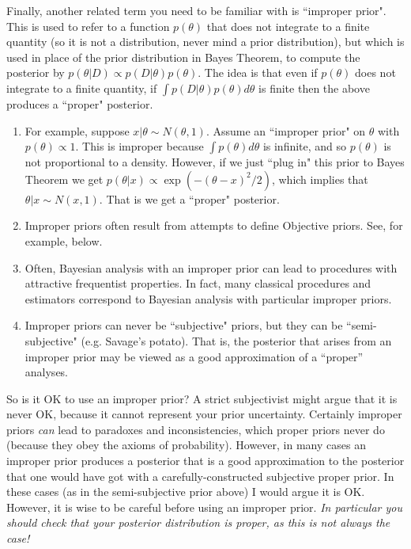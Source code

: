 \documentclass[12pt]{article}
\begin{document}
Finally, another related term you need to be familiar with is ``improper prior". This is used to refer to a function $p(\theta)$ that does not integrate to a finite quantity (so it is not a distribution, never mind a prior distribution), but which is used in place of the prior distribution in Bayes Theorem, to compute the posterior by
$p(\theta | D) \propto p(D|\theta) p(\theta)$. 
The idea is that even if $p(\theta)$ does not integrate to a finite quantity,
if $\int p(D|\theta) p(\theta) d\theta$ is finite then
the above produces a ``proper" posterior. 
\begin{enumerate}
\item For example, suppose $x | \theta \sim N(\theta,1)$. Assume an ``improper prior" on $\theta$ with $p(\theta) \propto 1$. This is improper because $\int p(\theta) d\theta$ is infinite, and so $p(\theta)$ is not proportional to a density. However, if we just ``plug in" this prior to Bayes Theorem we get
$p(\theta | x) \propto \exp(-(\theta-x)^2/2)$, which implies that $\theta | x \sim N(x,1)$. That is we get a ``proper" posterior.
\item Improper priors often result from attempts to define Objective priors. See, for example, below.
\item  Often, Bayesian analysis with an improper prior can lead to
  procedures with attractive frequentist properties.  In fact, many
  classical procedures and estimators correspond to Bayesian analysis
  with particular improper priors.
\item Improper priors can never be ``subjective" priors, but they can be ``semi-subjective" (e.g. Savage's potato). That is, the posterior that arises from an improper prior may be viewed as a good approximation of a
  ``proper'' analyses.
\end{enumerate}

So is it OK to use an improper prior? A strict subjectivist  might argue that it is never OK, because it cannot represent your prior uncertainty.
Certainly improper priors {\it can} lead to paradoxes and inconsistencies, which proper priors never do
(because they obey the axioms of probability).
 However, in many cases an improper prior produces a posterior that is a good approximation to the posterior that one would have got with a carefully-constructed
subjective proper prior. In these cases (as in the semi-subjective prior above) I would argue it is OK. However, it is wise to be careful before using an improper prior. {\it In particular you should check that your posterior distribution is proper, as this is not always the case!}
\end{document}
